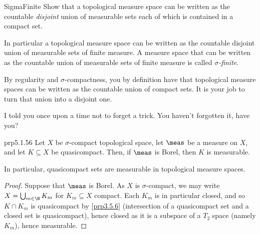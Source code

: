 \begin{exr}{}{SigmaFinite}
Show that a topological measure space can be written as the countable \emph{disjoint} union of measurable sets each of which is contained in a compact set.
\begin{rmk}
In particular a topological measure space can be written as the countable disjoint union of measurable sets of finite measure.  A measure space that can be written as the countable union of measurable sets of finite measure is called \emph{$\sigma$-finite}.
\end{rmk}
\begin{rmk}
By regularity and $\sigma$-compactness, you by definition have that topological measure spaces can be written as the countable union of compact sets.  It is your job to turn that union into a disjoint one.
\end{rmk}
\begin{rmk}
I told you once upon a time not to forget a trick.  You haven't forgotten it, have you?
\end{rmk}
\end{exr}
\begin{prp}{}{prp5.1.56}
Let $X$ be $\sigma$-compact topological space, let $\meas$ be a measure on $X$, and let $K\subseteq X$ be quasicompact.  Then, if $\meas$ is Borel, then $K$ is measurable.
\begin{rmk}
In particular, quasicompact sets are measurable in topological measure spaces.
\end{rmk}
\begin{proof}
Suppose that $\meas$ is Borel.  As $X$ is $\sigma$-compact, we may write $X=\bigcup _{m\in \N}K_m$ for $K_m\subseteq X$ compact.  Each $K_m$ is in particular closed, and so $K\cap K_m$ is quasicompact by \cref{prp3.5.6} (intersection of a quasicompact set and a closed set is quasicompact), hence closed as it is a subspace of a $T_2$ space (namely $K_m$), hence measurable.
\end{proof}
\end{prp}

